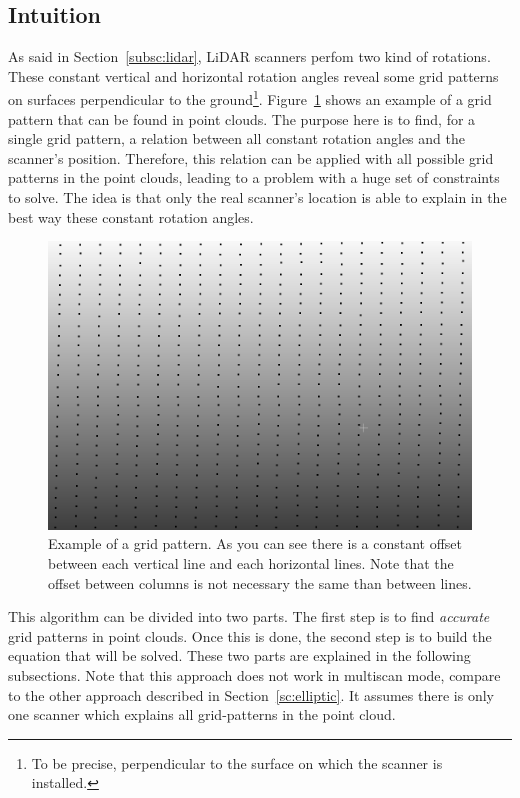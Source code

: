 \subsection{Intuition}
As said in Section~\ref{subsc:lidar}, LiDAR scanners perfom two kind of rotations. These constant vertical and horizontal rotation angles reveal some grid patterns on surfaces perpendicular to the ground\footnote{To be precise, perpendicular to the surface on which the scanner is installed.}. Figure~\ref{fig:grid1} shows an example of a grid pattern that can be found in point clouds. The purpose here is to find, for a single grid pattern, a relation between all constant rotation angles and the scanner's position. Therefore, this relation can be applied with all possible grid patterns in the point clouds, leading to a problem with a huge set of
constraints to solve. The idea is that only the real scanner's location is able to explain in the best way these constant rotation angles.

\begin{figure}[h]
  \centering
  \includegraphics[scale=0.5]{img/grid1.png}
  \caption{Example of a grid pattern. As you can see there is a constant offset between each vertical line and each horizontal lines. Note that the offset between columns is not necessary the same than between lines.}
  \label{fig:grid1}
\end{figure}

This algorithm can be divided into two parts. The first step is to find \emph{accurate} grid patterns in point clouds. Once this is done, the second step is to build the equation that will be solved. These two parts are explained in the following subsections. Note that this approach does not work in multiscan mode, compare to the other approach described in Section~\ref{sc:elliptic}. It assumes there is only one scanner which explains all grid-patterns in the point cloud.

